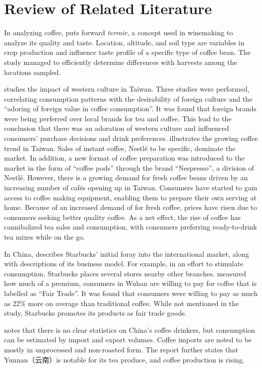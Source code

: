 \section{Review of Related Literature}\label{sec:Review of Related Literature}

In analyzing coffee, \autocite{silva_characterization_2014} puts forward
\emph{terroir}, a concept used in winemaking to analyze its quality and taste.
Location, altitude, and soil type are variables in crop production and influence
taste profile of a specific type of coffee bean. The study managed to
efficiently determine differences with harvests among the locations sampled.

\autocite{su_impact_2006} studies the impact of western culture in Taiwan. Three
studies were performed, correlating consumption patterns with the desirability
of foreign culture and the ``adoring of foreign value in coffee consumption''.
It was found that foreign brands were being perferred over local brands for tea
and coffee. This lead to the conclusion that there was an adoration of western
culture and influenced consumers' purchase decisions and drink preferences.
\autocite{euromonitor_international_coffee_2015} illustrates the growing coffee
trend in Taiwan. Sales of instant coffee, Nestlé to be specific, dominate the
market. In addition, a new format of coffee preparation was introduced to the
market in the form of ``coffee pods'' through the brand ``Nespresso'', a
division of Nestlé. However, there is a growing demand for fresh coffee beans
driven by an increasing number of cafés opening up in Taiwan. Consumers have
started to gain access to coffee making equipment, enabling them to prepare
their own serving at home. Because of an increased demand of for fresh coffee,
prices have risen due to consumers seeking better quality coffee. As a net
effect, the rise of coffee has cannibalized tea sales and consumption, with
consumers preferring ready-to-drink tea mixes while on the go.

In China, \autocite{harrison_exporting_2005} describes Starbucks' initial foray
into the international market, along with descriptions of its business model.
For example, in an effort to stimulate consumption, Starbucks places several
stores nearby other branches. \autocite{yang_consumer_2012} measured how much of
a premium, consumers in Wuhan are willing to pay for coffee that is labelled as
``Fair Trade''. It was found that consumers were willing to pay as much as 22\%
more on average than traditional coffee. While not mentioned in the study,
Starbucks promotes its products as fair trade goods.

\autocite{international_coffee_council_coffee_2015} notes that there is no clear
statistics on China's coffee drinkers, but consumption can be estimated by
import and export volumes. Coffee imports are noted to be mostly in unprocessed
and non-roasted form. The report further states  that Yunnan（云南）is notable for
its tea produce, and coffee production is rising.
